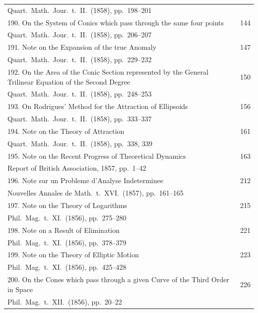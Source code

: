 \documentclass[12pt,a4paper]{article}
\theoremstyle{plain}
\begin{document}
\begin{longtable}{p{}r}
\multicolumn{2}{l}{\small Quart.\ Math.\ Jour.\ t.~II.\ (1858), pp.~198--201} \\[0.5em]
%
190. On the System of Conics which pass through the same four points \dotfill & 144 \\
\multicolumn{2}{l}{\small Quart.\ Math.\ Jour.\ t.~II.\ (1858), pp.~206--207} \\[0.5em]
%
191. Note on the Expansion of the true Anomaly \dotfill & 147 \\
\multicolumn{2}{l}{\small Quart.\ Math.\ Jour.\ t.~II.\ (1858), pp.~229--232} \\[0.5em]
%
192. On the Area of the Conic Section represented by the General Trilinear Equation of the Second Degree \dotfill & 150 \\
\multicolumn{2}{l}{\small Quart.\ Math.\ Jour.\ t.~II.\ (1858), pp.~248--253} \\[0.5em]
%
193. On Rodrigues' Method for the Attraction of Ellipsoids \dotfill & 156 \\
\multicolumn{2}{l}{\small Quart.\ Math.\ Jour.\ t.~II.\ (1858), pp.~333--337} \\[0.5em]
%
194. Note on the Theory of Attraction \dotfill & 161 \\
\multicolumn{2}{l}{\small Quart.\ Math.\ Jour.\ t.~II.\ (1858), pp.~338, 339} \\[0.5em]
%
195. Note on the Recent Progress of Theoretical Dynamics \dotfill & 163 \\
\multicolumn{2}{l}{\small Report of British Association, 1857, pp.~1--42} \\[0.5em]
%
196. Note sur un Probleme d'Analyse Indeterminee \dotfill & 212 \\
\multicolumn{2}{l}{\small Nouvelles Annales de Math.\ t.~XVI.\ (1857), pp.~161--165} \\[0.5em]
%
197. Note on the Theory of Logarithms \dotfill & 215 \\
\multicolumn{2}{l}{\small Phil.\ Mag.\ t.~XI.\ (1856), pp.~275--280} \\[0.5em]
%
198. Note on a Result of Elimination \dotfill & 221 \\
\multicolumn{2}{l}{\small Phil.\ Mag.\ t.~XI.\ (1856), pp.~378--379} \\[0.5em]
%
199. Note on the Theory of Elliptic Motion \dotfill & 223 \\
\multicolumn{2}{l}{\small Phil.\ Mag.\ t.~XI.\ (1856), pp.~425--428} \\[0.5em]
%
200. On the Cones which pass through a given Curve of the Third Order in Space \dotfill & 226 \\
\multicolumn{2}{l}{\small Phil.\ Mag.\ t.~XII.\ (1856), pp.~20--22} \\[0.5em]
\bottomrule
\end{longtable}
\end{document}
